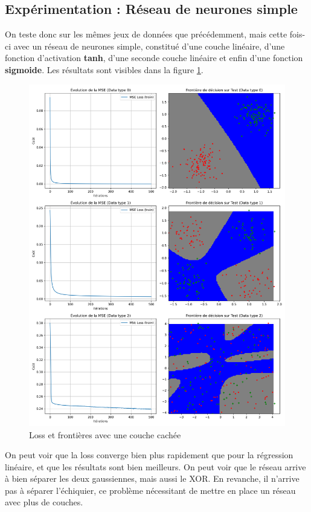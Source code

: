 \documentclass{article}
\begin{document}
\subsection{Expérimentation : Réseau de neurones simple}

On teste donc sur les mêmes jeux de données que précédemment, mais cette fois-ci avec un réseau de neurones simple, constitué d'une couche linéaire, d'une fonction d'activation \textbf{tanh}, d'une seconde couche linéaire et enfin d'une fonction \textbf{sigmoide}. Les résultats sont visibles dans la figure \ref{fig:simplenn}.

\begin{figure}[H]
    \centering
    \includegraphics[width=0.8\linewidth]{Images/sigmoide_tanh_combined.png}
    \caption{Loss et frontières avec une couche cachée}
	\label{fig:simplenn}
\end{figure}

On peut voir que la loss converge bien plus rapidement que pour la régression linéaire, et que les résultats sont bien meilleurs. On peut voir que le réseau arrive à bien séparer les deux gaussiennes, mais aussi le XOR. En revanche, il n'arrive pas à séparer l'échiquier, ce problème nécessitant de mettre en place un réseau avec plus de couches.
\end{document}
